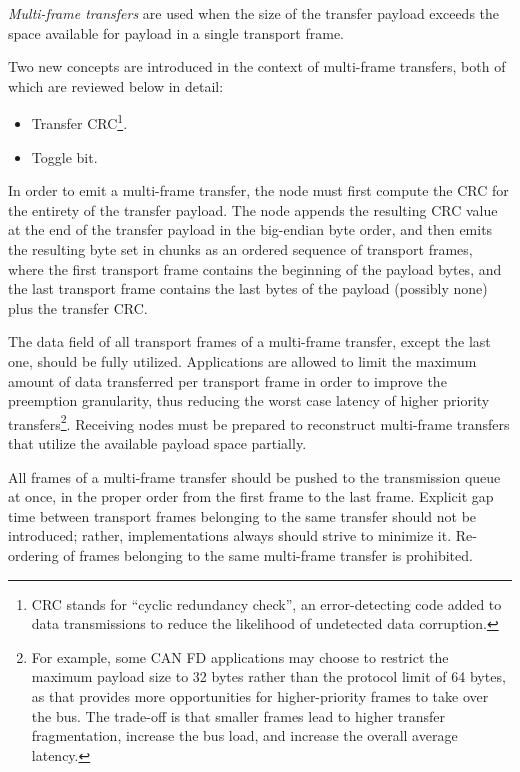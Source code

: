 \emph{Multi-frame transfers} are used when the size of the transfer payload exceeds the space available
for payload in a single transport frame.

Two new concepts are introduced in the context of multi-frame transfers, both of which are reviewed below in detail:
\begin{samepage}
\begin{itemize}
    \item Transfer CRC\footnote{CRC stands for ``cyclic redundancy check'', an error-detecting code
    added to data transmissions to reduce the likelihood of undetected data corruption.}.
    \item Toggle bit.
\end{itemize}
\end{samepage}

In order to emit a multi-frame transfer, the node must first compute the CRC for the entirety of the transfer payload.
The node appends the resulting CRC value at the end of the transfer payload in the big-endian byte order,
and then emits the resulting byte set in chunks as an ordered sequence of transport frames,
where the first transport frame contains the beginning of the payload bytes,
and the last transport frame contains the last bytes of the payload (possibly none) plus the transfer CRC.

The data field of all transport frames of a multi-frame transfer, except the last one, should be fully utilized.
Applications are allowed to limit the maximum amount of data transferred per transport frame in order to
improve the preemption granularity, thus reducing the worst case latency of higher priority
transfers\footnote{For example, some CAN FD applications may choose to restrict the maximum payload size to 32 bytes
rather than the protocol limit of 64 bytes, as that provides more opportunities for higher-priority frames to
take over the bus. The trade-off is that smaller frames lead to higher transfer fragmentation, increase the bus load,
and increase the overall average latency.}.
Receiving nodes must be prepared to reconstruct multi-frame transfers that utilize the
available payload space partially.

All frames of a multi-frame transfer should be pushed to the transmission queue at once,
in the proper order from the first frame to the last frame.
Explicit gap time between transport frames belonging to the same transfer should not be introduced;
rather, implementations always should strive to minimize it.
Re-ordering of frames belonging to the same multi-frame transfer is prohibited.

